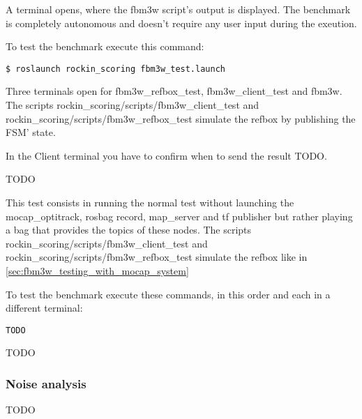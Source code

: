\documentclass[a4paper]{article}
\begin{document}
A terminal opens, where the fbm3w script's output is displayed.
The benchmark is completely autonomous and doesn't require any user input during the exeution.


\label{sec:fbm3w_testing_with_mocap_system}

To test the benchmark execute this command:
\begin{verbatim}
$ roslaunch rockin_scoring fbm3w_test.launch
\end{verbatim} 

Three terminals open for fbm3w\_refbox\_test, fbm3w\_client\_test and fbm3w.
The scripts rockin\_scoring/scripts/fbm3w\_client\_test and rockin\_scoring/scripts/fbm3w\_refbox\_test simulate the refbox by publishing the FSM' state.

In the Client terminal you have to confirm when to send the result TODO.



TODO

This test consists in running the normal test without launching the mocap\_optitrack, rosbag record, map\_server and tf publisher but rather playing a bag that provides the topics of these nodes.
The scripts rockin\_scoring/scripts/fbm3w\_client\_test and rockin\_scoring/scripts/fbm3w\_refbox\_test simulate the refbox like in \ref{sec:fbm3w_testing_with_mocap_system}

To test the benchmark execute these commands, in this order and each in a different terminal:
\begin{verbatim}
TODO
\end{verbatim} 

TODO

\subsubsection{Noise analysis}
\label{sec:fbm3w_noise_analysis}

TODO

\clearpage
\end{document}

